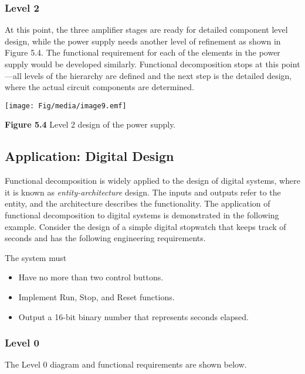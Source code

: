 \subsubsection*{Level 2}\label{level-2}

At this point, the three amplifier stages are ready for detailed
component level design, while the power supply needs another level of
refinement as shown in Figure 5.4. The functional requirement for each
of the elements in the power supply would be developed similarly.
Functional decomposition stops at this point---all levels of the
hierarchy are defined and the next step is the detailed design, where
the actual circuit components are determined.

\texttt{[image: Fig/media/image9.emf]}

\textbf{Figure 5.4} Level 2 design of the power supply.

\subsection{Application: Digital
Design}\label{application-digital-design}

Functional decomposition is widely applied to the design of digital
systems, where it is known as \emph{entity-architecture} design. The
inputs and outputs refer to the entity, and the architecture describes
the functionality. The application of functional decomposition to
digital systems is demonstrated in the following example. Consider the
design of a simple digital stopwatch that keeps track of seconds and has
the following engineering requirements.

The system must

\begin{itemize}
\item
  Have no more than two control buttons.
\item
  Implement Run, Stop, and Reset functions.
\item
  Output a 16-bit binary number that represents seconds elapsed.
\end{itemize}

\subsubsection*{Level 0}\label{level-0-1}

The Level 0 diagram and functional requirements are shown below.


